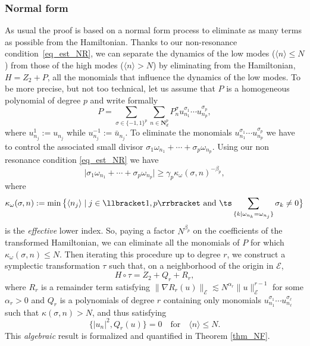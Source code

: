 \label{subsec_scheme}

\subsubsection*{Normal form} As usual the proof is based on a normal form process to eliminate as many terms as possible from the Hamiltonian. Thanks to our non-resonance condition~\eqref{eq_est_NR}, we can separate the dynamics of the low modes ($\langle n\rangle\leq N$) from those of the high modes ($\langle n\rangle> N$)
by eliminating from the Hamiltonian, $H=Z_2+P$, all the monomials that influence the dynamics of the low modes. To be more precise, but not too technical, let us assume that $P$ is a homogeneous polynomial of degree $p$ and write formally
\[
P=\sum_{\sigma\in\{-1,1\}^p}\sum_{n\in \mathbf{N}^p_d } P^\sigma_n u_{n_1}^{\sigma_1}\cdots u_{n_p}^{\sigma_p},
\]
where $u_{n_j}^{1}:=u_{n_j}$ while $u_{n_j}^{-1}:=\bar u_{n_j}$.
To eliminate the monomials $u_{n_1}^{\sigma_1}\cdots u_{n_p}^{\sigma_p}$ we have to control the associated small divisor
$\sigma_1 \omega_{n_1}+\cdots+\sigma_p \omega_{n_p}$.
Using our non resonance condition \eqref{eq_est_NR} we have
\[
\big| \sigma_1 \omega_{n_1}+\cdots+\sigma_p \omega_{n_p}\big|\geq \gamma_p\kappa_\omega(\sigma,n)^{-\beta_p},
\]
where
\begin{equation}
\label{eq_def_kappa}
\kappa_\omega(\sigma,n):= \min \big\{\langle n_j \rangle \mid j \in \llbracket 1,p \rrbracket \text{ and } \ts\sum_{\{k\mid \omega_{n_k} = \omega_{n_j}\}} \sigma_k \neq 0\big\}
\end{equation}
is the \emph{effective} lower index.
So, paying a factor $N^{\beta_p}$ on the coefficients of the transformed Hamiltonian, we can eliminate all the monomials of $P$ for which $\kappa_\omega(\sigma,n)\leq N$. Then iterating this procedure up to degree $r$, we construct a symplectic transformation $\tau$ such that, on a neighborhood of the origin in ${\mathcal{E}}$,
\[
H\circ \tau =Z_2+Q_r+R_r,
\]
where $R_r$ is a remainder term satisfying $\|\nabla R_r(u)\|_{\mathcal{E}}\lesssim N^{\alpha_r}\|u\|^{r-1}_{\mathcal{E}}$ for some $\alpha_r>0$ and $Q_r$ is a polynomials of degree $r$ containing only monomials $ u_{n_1}^{\sigma_1}\cdots u_{n_\ell}^{\sigma_\ell}$ such that $\kappa(\sigma,n)> N$, and thus satisfying
\[
\{|u_n|^2,Q_r(u)\}=0
\quad \mathrm{for} \quad
\langle n \rangle \leq N.
\]
This \emph{algebraic} result is formalized and quantified in Theorem \ref{thm_NF}.

